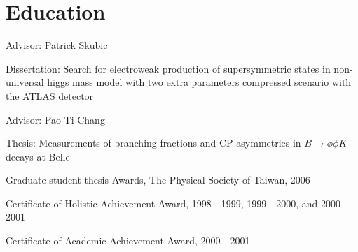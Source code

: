 \documentclass[letterpaper]{deedy-resume-openfont}
\begin{document}

\section{Education} 

\begin{tightemize}
\item Advisor: Patrick Skubic
\item Dissertation: Search for electroweak production of supersymmetric states in non-universal higgs mass model with two extra parameters compressed scenario with the ATLAS detector\\
      \href{https://hdl.handle.net/11244/299774}{\color{link}{Dissertation link}}
\end{tightemize}
\sectionsep

\begin{tightemize}
\item Advisor: Pao-Ti Chang
\item Thesis: Measurements of branching fractions and CP asymmetries in $B \to \phi \phi K$ decays at Belle\\
      \href{http://www.airitilibrary.com/Publication/alDetailedMesh1?DocID=U0001-1407200616551200}{\color{link}{Thesis link}}
\item Graduate student thesis Awards, The Physical Society of Taiwan, 2006
\end{tightemize}
\sectionsep

\begin{tightemize}
\item Certificate of Holistic Achievement Award, 1998 - 1999, 1999 - 2000, and 2000 - 2001
\item Certificate of Academic Achievement Award, 2000 - 2001
\end{tightemize}
\sectionsep




\end{document}
